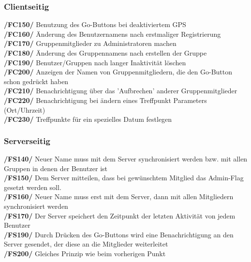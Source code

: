\subsubsection{Clientseitig}
     \textbf{/FC150/} Benutzung des Go-Buttons bei deaktiviertem GPS\\
     \textbf{/FC160/} Änderung des Benutzernamens nach erstmaliger Registrierung\\
     \textbf{/FC170/} Gruppenmitglieder zu Administratoren machen                \\
     \textbf{/FC180/} Änderung des Gruppennamens nach erstellen der Gruppe        \\
     \textbf{/FC190/} Benutzer/Gruppen nach langer Inaktivität löschen                     \\
     \textbf{/FC200/} Anzeigen der Namen von Gruppenmitgliedern, die den Go-Button schon gedrückt haben\\
     \textbf{/FC210/} Benachrichtigung über das 'Aufbrechen' anderer Gruppenmitglieder\\
     \textbf{/FC220/} Benachrichtigung bei ändern eines Treffpunkt Parameters (Ort/Uhrzeit)\\
     \textbf{/FC230/} Treffpunkte für ein spezielles Datum festlegen\\
\subsubsection{Serverseitig}
     \textbf{/FS140/} Neuer Name muss mit dem Server synchronisiert werden bzw. mit allen Gruppen in denen der Benutzer ist\\
     \textbf{/FS150/} Dem Server mitteilen, dass bei gewünschtem Mitglied das Admin-Flag gesetzt werden soll.\\
     \textbf{/FS160/} Neuer Name muss erst mit dem Server, dann mit allen Mitgliedern synchronisiert werden\\
     \textbf{/FS170/} Der Server speichert den Zeitpunkt der letzten Aktivität von jedem Benutzer\\
     \textbf{/FS190/} Durch Drücken des Go-Buttons wird eine Benachrichtigung an den Server gesendet, der diese an die Mitglieder weiterleitet\\
     \textbf{/FS200/} Gleiches Prinzip wie beim vorherigen Punkt\\
